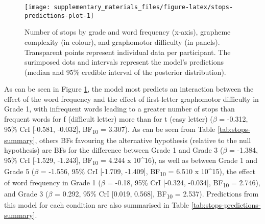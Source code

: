 \documentclass[
  11pt,
  english,
  ,doc,mask,floatsintext]{apa6}
\begin{document}
\begin{figure}[!htb]

{\centering \texttt{[image: supplementary\_materials\_files/figure-latex/stops-predictions-plot-1]} 

}

\caption{Number of stops by grade and word frequency (x-axis), grapheme complexity (in colour), and graphomotor difficulty (in panels). Transparent points represent individual data per participant. The surimposed dots and intervals represent the model's predictions (median and 95\% credible interval of the posterior distribution).}\label{fig:stops-predictions-plot}
\end{figure}

As can be seen in Figure \ref{fig:stops-predictions-plot}, the model most predicts an interaction between the effect of the word frequency and the effect of first-letter graphomotor difficulty in Grade 1, with infrequent words leading to a greater number of stops than frequent words for f (difficult letter) more than for t (easy letter)
(\(\beta\) = -0.312, 95\% CrI {[}-0.581, -0.032{]}, BF\textsubscript{10} = 3.307). As can be seen from Table \ref{tab:stops-summary}, others BFs favouring the alternative hypothesis (relative to the null hypothesis) are BFs for the difference between Grade 1 and Grade 3 (\(\beta\) = -1.384, 95\% CrI {[}-1.529, -1.243{]}, BF\textsubscript{10} = 4.244 x 10\^{}16), as well as between Grade 1 and Grade 5 (\(\beta\) = -1.556, 95\% CrI {[}-1.709, -1.409{]}, BF\textsubscript{10} = 6.510 x 10\^{}15), the effect of word frequency in Grade 1 (\(\beta\) = -0.18, 95\% CrI {[}-0.324, -0.034{]}, BF\textsubscript{10} = 2.746), and Grade 3 (\(\beta\) = 0.292, 95\% CrI {[}0.019, 0.568{]}, BF\textsubscript{10} = 2.537). Predictions from this model for each condition are also summarised in Table \ref{tab:stops-predictions-summary}.
\end{document}
